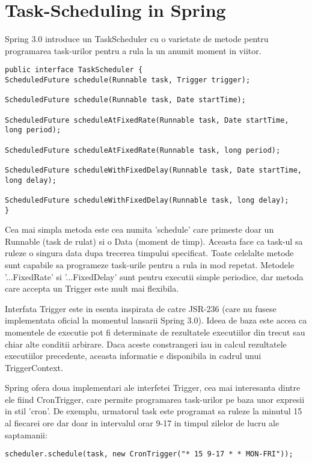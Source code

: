 \section{Task-Scheduling in Spring}

Spring 3.0 introduce un TaskScheduler cu o varietate de metode pentru programarea task-urilor pentru a rula la un anumit moment in viitor.
\begin{lstlisting}[breaklines=true]
public interface TaskScheduler {
ScheduledFuture schedule(Runnable task, Trigger trigger);

ScheduledFuture schedule(Runnable task, Date startTime);

ScheduledFuture scheduleAtFixedRate(Runnable task, Date startTime, long period);

ScheduledFuture scheduleAtFixedRate(Runnable task, long period);

ScheduledFuture scheduleWithFixedDelay(Runnable task, Date startTime, long delay);

ScheduledFuture scheduleWithFixedDelay(Runnable task, long delay);
}
\end{lstlisting}

Cea mai simpla metoda este cea numita 'schedule' care primeste doar un Runnable (task de rulat) si o Data (moment de timp).
Aceasta face ca task-ul sa ruleze o singura data dupa trecerea timpului specificat.
Toate celelalte metode sunt capabile sa programeze task-urile pentru a rula in mod repetat.
Metodele '...FixedRate' si '...FixedDelay' sunt pentru executii simple periodice, dar metoda care accepta un Trigger este mult mai flexibila.

Interfata Trigger este in esenta inspirata de catre JSR-236 (care nu fusese implementata oficial la momentul lansarii Spring 3.0).
Ideea de baza este accea ca momentele de executie pot fi determinate de rezultatele executiilor din trecut sau chiar alte conditii arbirare.
Daca aceste constrangeri iau in calcul rezultatele executiilor precedente, aceasta informatie e disponibila in cadrul unui TriggerContext.

Spring ofera doua implementari ale interfetei Trigger, cea mai interesanta dintre ele fiind CronTrigger, care permite programarea task-urilor pe baza unor expresii in stil 'cron'.
De exemplu, urmatorul task este programat sa ruleze la minutul 15 al fiecarei ore dar doar in intervalul orar 9-17 in timpul zilelor de lucru ale saptamanii:
\begin{lstlisting}
scheduler.schedule(task, new CronTrigger("* 15 9-17 * * MON-FRI"));
\end{lstlisting}


